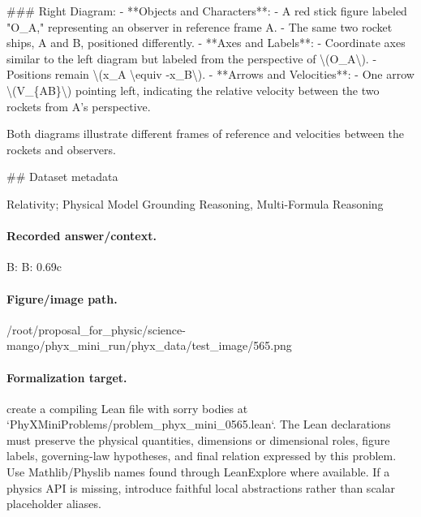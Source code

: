\#\#\# Right Diagram:
- **Objects and Characters**:
  - A red stick figure labeled "O\_A," representing an observer in reference frame A.
  - The same two rocket ships, A and B, positioned differently.
- **Axes and Labels**:
  - Coordinate axes similar to the left diagram but labeled from the perspective of \textbackslash{}(O\_A\textbackslash{}).
  - Positions remain \textbackslash{}(x\_A \textbackslash{}equiv -x\_B\textbackslash{}).
- **Arrows and Velocities**:
  - One arrow \textbackslash{}(V\_\{AB\}\textbackslash{}) pointing left, indicating the relative velocity between the two rockets from A's perspective.

Both diagrams illustrate different frames of reference and velocities between the rockets and observers.

\#\# Dataset metadata

Relativity; Physical Model Grounding Reasoning, Multi-Formula Reasoning

\paragraph{Recorded answer/context.}
B: B: 0.69c

\paragraph{Figure/image path.}
/root/proposal\_for\_physic/science-mango/phyx\_mini\_run/phyx\_data/test\_image/565.png

\paragraph{Formalization target.}
create a compiling Lean file with sorry bodies at `PhyXMiniProblems/problem\_phyx\_mini\_0565.lean`. The Lean declarations must preserve the physical quantities, dimensions or dimensional roles, figure labels, governing-law hypotheses, and final relation expressed by this problem.
Use Mathlib/Physlib names found through LeanExplore where available. If a physics API is missing, introduce faithful local abstractions rather than scalar placeholder aliases.

